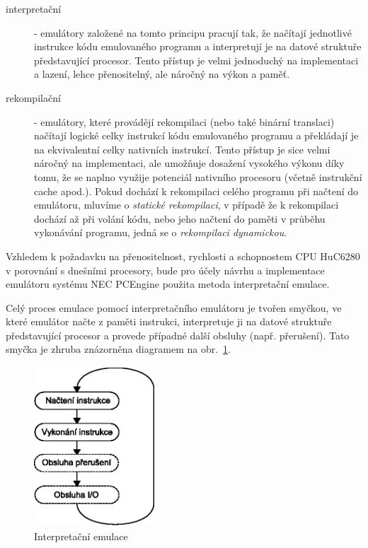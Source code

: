 \begin{description}
\item[interpretační] - emulátory založené na tomto principu pracují tak, že
	načítají jednotlivé instrukce kódu emulovaného programu a interpretují je
	na datové struktuře představující procesor. Tento přístup je velmi
	jednoduchý na implementaci a lazení, lehce přenositelný, ale náročný na
	výkon a paměť.

\item[rekompilační] - emulátory, které provádějí rekompilaci (nebo také binární
	translaci) načítají logické celky instrukcí kódu emulovaného programu a
	překládají je na ekvivalentní celky nativních instrukcí. Tento přístup je
	sice velmi náročný na implementaci, ale umožňuje dosažení vysokého výkonu
	díky tomu, že se naplno využije potenciál nativního procesoru (včetně
	instrukční cache apod.). Pokud dochází k rekompilaci celého programu při
	načtení do emulátoru, mluvíme o {\em statické rekompilaci}, v případě že k
	rekompilaci dochází až při volání kódu, nebo jeho načtení do paměti v průběhu
	vykonávání programu, jedná se o {\em rekompilaci dynamickou}.
\end{description}

Vzhledem k požadavku na přenositelnost, rychlosti a schopnostem CPU HuC6280 v
porovnání s dnešními procesory, bude pro účely návrhu a implementace emulátoru
systému NEC PCEngine použita metoda interpretační emulace.

Celý proces emulace pomocí interpretačního emulátoru je tvořen smyčkou, ve
které emulátor načte z paměti instrukci, interpretuje ji na datové struktuře
představující procesor a provede případné další obsluhy (např. přerušení).
Tato smyčka je zhruba znázorněna diagramem na obr.~\ref{fig:anal_interpreter}.

\begin{figure}[ht]
\begin{center}
\includegraphics[width=4.5cm,height=6cm]{fig/anal_interpret}
\caption{Interpretační emulace\label{fig:anal_interpreter}}
\end{center}
\end{figure}

